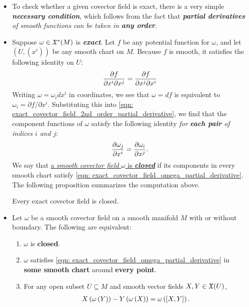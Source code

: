 \documentclass[11pt]{article}
\begin{document}
\begin{itemize}
\item \begin{remark}
To check whether a given covector field is exact, there is a very simple \emph{\textbf{necessary condition}}, which follows from the fact that \emph{\textbf{partial derivatives} of smooth functions can be taken in \textbf{any order}}.
\end{remark}

\item \begin{remark}
Suppose $\omega \in {\mathfrak X}^{*}(M)$ is \textbf{\emph{exact}}. Let $f$ be any potential function for $\omega$, and let $(U, (x^i))$ be any smooth chart on $M$. Because $f$ is
smooth, it satisfies the following identity on $U$:
\begin{align}
\frac{\partial f}{ \partial x^{i}\partial x^{j}} = \frac{\partial f}{ \partial x^{j}\partial x^i} \label{eqn: exact_covector_field_2nd_order_partial_derivative}
\end{align}
Writing $\omega = \omega_i dx^{i}$ in coordinates, we see that $\omega = df$ is equivalent to $\omega_i =
\partial f / \partial x^i$. Substituting this into \eqref{eqn: exact_covector_field_2nd_order_partial_derivative}, we find that the component functions of $\omega$
satisfy the following identity \emph{for \textbf{each pair} of indices $i$ and $j$}:
\begin{align}
 \frac{\partial \omega_{j}}{ \partial x^{i}}= \frac{\partial \omega_i}{ \partial x^{j}}. \label{eqn: exact_covector_field_omega_partial_derivative}
\end{align} We say that \underline{a \emph{smooth covector field} $\omega$ is \emph{\textbf{closed}}} if its components in every smooth
chart satisfy \eqref{eqn: exact_covector_field_omega_partial_derivative}. The following proposition summarizes the computation above.

\begin{proposition}
Every exact covector field is closed.
\end{proposition}
\end{remark}

\item \begin{proposition}
Let $\omega$ be a smooth covector field on a smooth manifold $M$ with or without boundary. The following are equivalent:
\begin{enumerate}
\item $\omega$ is \textbf{closed}.
\item $\omega$ satisfies \eqref{eqn: exact_covector_field_omega_partial_derivative} in \textbf{some smooth chart} around \textbf{every point}.
\item For any open subset $U \subseteq M$ and smooth vector fields $X, Y \in {\mathfrak X}(U)$,
\begin{align}
X\left(\omega\left(Y\right)\right) - Y\left(\omega\left(X\right)\right) = \omega\left([X, Y]\right).\label{eqn: exact_covector_field_vector_field_lie_bracket}
\end{align}
\end{enumerate}
\end{proposition}


\end{itemize}
\end{document}
